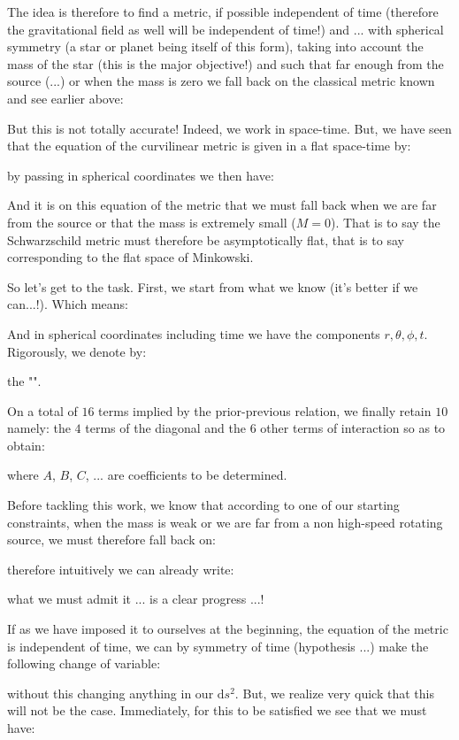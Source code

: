 	The idea is therefore to find a metric, if possible independent of time (therefore the gravitational field as well will be independent of time!) and ... with spherical symmetry (a star or planet being itself of this form), taking into account the mass of the star (this is the major objective!) and such that far enough from the source (...) or when the mass is zero we fall back on the classical metric known and see earlier above:
	
	But this is not totally accurate! Indeed, we work in space-time. But, we have seen that the equation of the curvilinear metric is given in a flat space-time by:
	
	by passing in spherical coordinates we then have:
	
	And it is on this equation of the metric that we must fall back when we are far from the source or that the mass is extremely small ($M=0$). That is to say the Schwarzschild metric must therefore be asymptotically flat, that is to say corresponding to the flat space of Minkowski.

	So let's get to the task. First, we start from what we know (it's better if we can...!). Which means:
	
	And in spherical coordinates including time we have the components $r,\theta,\phi,t$. Rigorously, we denote by:
	
	the "".
	
	On a total of $16$ terms implied by the prior-previous relation, we finally retain $10$ namely: the $4$ terms of the diagonal and the $6$ other terms of interaction so as to obtain:
	
	where $A$, $B$, $C$, ... are coefficients to be determined.

	Before tackling this work, we know that according to one of our starting constraints, when the mass is weak or we are far from a  non high-speed rotating source, we must therefore fall back on:
	
	therefore intuitively we can already write:
	
	what we must admit it ... is a clear progress ...!

	If as we have imposed it to ourselves at the beginning, the equation of the metric is independent of time, we can by symmetry of time (hypothesis ...) make the following change of variable:
	
	without this changing anything in our $\mathrm{d}s^2$. But, we realize very quick that this will not be the case. Immediately, for this to be satisfied we see that we must have:
	

